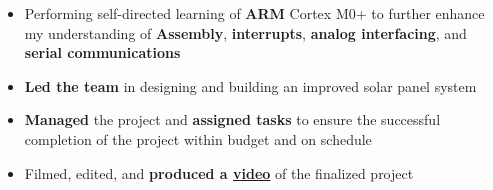 













\begin{itemize}
\item Performing self-directed learning of {\bfseries ARM} Cortex M0+ to further enhance my understanding of {\bfseries Assembly}, {\bfseries interrupts}, {\bfseries analog interfacing}, and {\bfseries serial communications}
\end{itemize}
\smallskip\smallskip
{}
\begin{itemize}
\item {\bfseries Led the team} in designing and building an improved solar panel system
\item {\bfseries Managed} the project and {\bfseries assigned tasks} to ensure the successful completion of the project within budget and on schedule
\item Filmed, edited, and {\bfseries produced a \href{https://youtu.be/M04nFNrHHlE}{\color{blue}video}} of the finalized project
\end{itemize}


